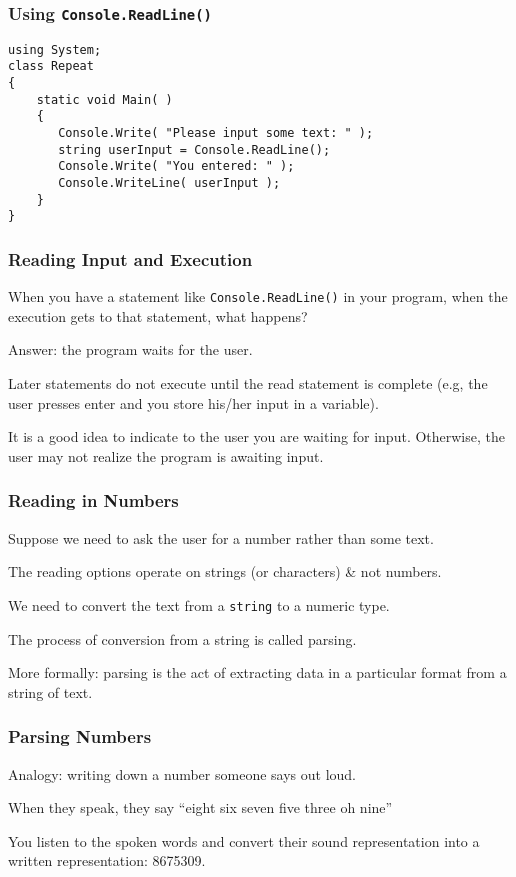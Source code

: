\begin{frame}[fragile]
\frametitle{Using \texttt{Console.ReadLine()}}

\begin{verbatim}
using System;
class Repeat
{
    static void Main( )
    {
       Console.Write( "Please input some text: " );
       string userInput = Console.ReadLine();
       Console.Write( "You entered: " );
       Console.WriteLine( userInput );
    }
}
\end{verbatim}

\end{frame}


\begin{frame}
\frametitle{Reading Input and Execution}
When you have a statement like \texttt{Console.ReadLine()} in your program, when the execution gets to that statement, what happens?

Answer: the program waits for the user.

Later statements do not execute until the read statement is complete (e.g, the user presses enter and you store his/her input in a variable).

It is a good idea to indicate to the user you are waiting for input. Otherwise, the user may not realize the program is awaiting input.

\end{frame}

\begin{frame}
\frametitle{Reading in Numbers}
Suppose we need to ask the user for a number rather than some text.

The reading options operate on strings (or characters) \& not numbers.

We need to convert the text from a \texttt{string} to a numeric type.

The process of conversion from a string is called \alert{parsing}.

More formally: parsing is the act of extracting data in a particular format from a string of text.

\end{frame}

\begin{frame}
\frametitle{Parsing Numbers}



Analogy: writing down a number someone says out loud.

When they speak, they say ``eight six seven five three oh nine''

You listen to the spoken words and convert their sound representation into a written representation: 8675309.

\end{frame}

